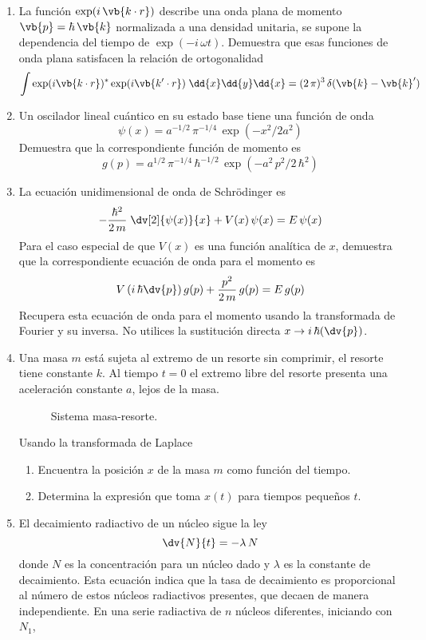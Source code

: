 \begin{enumerate}
\item La función $\exp(i \, \vb{k \cdot r})$ describe una onda plana de momento $\vb{p} = \hbar \, \vb{k}$ normalizada a una densidad unitaria, se supone la dependencia del tiempo de $\exp(-i \, \omega t)$. Demuestra que esas funciones de onda plana satisfacen la relación de ortogonalidad
\[ \int \exp(i \vb{k \cdot r} ){}^{*}  \exp(i \vb{k^{\prime} \cdot r}) \; \dd{x} \dd{y} \dd{x} =  (2 \, \pi)^{3} \, \delta(\vb{k} - \vb{k}^{\prime})  \]
\item Un oscilador lineal cuántico en su estado base tiene una función de onda
\[ \psi(x) = a^{-1/2} \, \pi^{-1/4} \, \exp(-x^{2}/2a^{2}) \]
Demuestra que la correspondiente función de momento es
\[ g(p) = a^{1/2} \, \pi^{-1/4} \, \hbar^{-1/2} \, \exp(-a^{2} \, p^{2}/2 \, \hbar^{2}) \]
\item La ecuación unidimensional de onda de Schrödinger es
\[ - \dfrac{\hbar^{2}}{2 \, m} \; \dv[2]{\psi(x)}{x} +  V(x) \, \psi(x) = E \, \psi (x) \]
Para el caso especial de que $V(x)$ es una función analítica de $x$, demuestra que la correspondiente ecuación de onda para el momento es
\[ V \left( i \, \hbar \dv{p} \right) g(p) + \dfrac{p^{2}}{2 \, m} \, g(p) =  E \, g(p)  \]
Recupera esta ecuación de onda para el momento usando la transformada de Fourier y su inversa. No utilices la sustitución directa $\displaystyle{x \to i \, \hbar (\dv{p})}$.
\item Una masa $m$ está sujeta al extremo de un resorte sin comprimir, el resorte tiene constante $k$. Al tiempo $t=0$ el extremo libre del resorte presenta una aceleración constante $a$, lejos de la masa. 
\begin{figure}[H]
\centering

\caption{Sistema masa-resorte.}
\label{fig:figura1}
\end{figure}
Usando la transformada de Laplace
\begin{enumerate}[label=\alph*)]
\item Encuentra la posición $x$ de la masa $m$ como función del tiempo.
\item Determina la expresión que toma $x(t)$ para tiempos pequeños $t$.
\end{enumerate}
\item El decaimiento radiactivo de un núcleo sigue la ley
\[ \dv{N}{t} = - \lambda \, N \]
donde $N$ es la concentración para un núcleo dado y $\lambda$ es la constante de decaimiento. Esta ecuación indica que la tasa de decaimiento es proporcional al número de estos núcleos radiactivos presentes, que decaen de manera independiente. En una serie radiactiva de $n$ núcleos diferentes, iniciando con $N_{1}$,

\end{enumerate}
